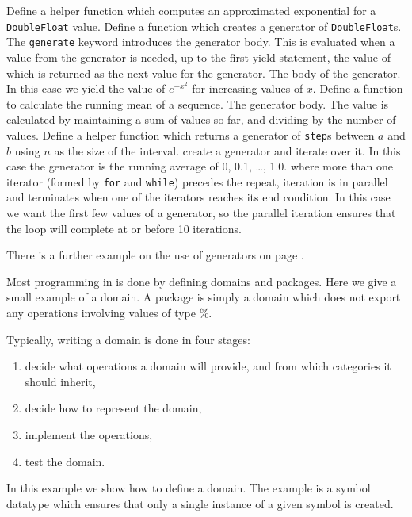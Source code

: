 
\begin{description}
 Define a helper function which computes an approximated
exponential for a \verb+DoubleFloat+ value.
 Define a function which creates a generator of 
\verb"DoubleFloat"s.
 The \verb+generate+ keyword introduces the generator body. This is
evaluated when a value from the generator is needed, up to the first
yield statement, the value of which is returned as the next value for
the generator. 
 The body of the generator. In this case we yield the
value of $e^{-x^2}$ for increasing values of $x$.
 Define a function to calculate the running mean of a
sequence. 
 The generator body. The value is calculated by
maintaining a sum of values so far, and dividing by the number of
values. 
 Define a helper function which returns a generator of
\verb+step+s between $a$ and $b$ using $n$ as the size of the interval.
 create a generator and iterate over it. In this case the
generator is the running average of 0, 0.1, \ldots, 1.0.
 where more than one iterator  (formed by {\tt for}
and {\tt while}) precedes the repeat, iteration is in parallel and
terminates when one of the iterators reaches its end condition. In
this case we want the first few values of a generator, so the parallel
iteration ensures that the loop will complete at or before 10 iterations.
\end{description}
There is a further example on the use of generators on page \pageref{recurseSample}.


\newpage
{}

Most programming in \asharp{} is done by defining domains and
packages. Here we give a small example of a domain. A package is simply
a domain which does not export any operations involving values of
type \%. 

Typically, writing a domain is done in four stages:
\begin{enumerate}
\item decide what operations a domain will provide, and from which
\linebreak categories it should inherit,
\item decide how to represent the domain,
\item implement the operations,
\item test the domain.
\end{enumerate}
In this example we show how to define a domain. The example is a
symbol datatype which ensures that only a single instance of a given
symbol is created.

